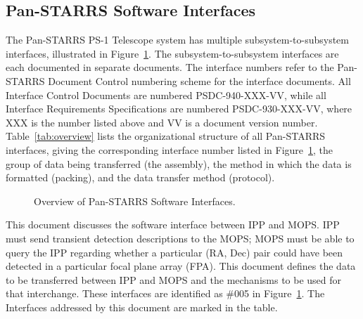 \documentclass[panstarrs,spec]{panstarrs}
\begin{document}
\subsection{Pan-STARRS Software Interfaces}

The Pan-STARRS PS-1 Telescope system has multiple
subsystem-to-subsystem interfaces, illustrated in
Figure~\ref{fig:overview}.  The subsystem-to-subsystem interfaces are
each documented in separate documents.  The interface numbers refer to
the Pan-STARRS Document Control numbering scheme for the interface
documents.  All Interface Control Documents are numbered
PSDC-940-XXX-VV, while all Interface Requirements Specifications are
numbered PSDC-930-XXX-VV, where XXX is the number listed above and VV
is a document version number.  Table~\ref{tab:overview} lists the
organizational structure of all Pan-STARRS interfaces, giving the
corresponding interface number listed in Figure~\ref{fig:overview},
the group of data being transferred (the assembly), the method in
which the data is formatted (packing), and the data transfer method
(protocol).

\begin{figure}
  \begin{center}
    \caption{Overview of Pan-STARRS Software Interfaces.}
    \label{fig:overview}
  \end{center}
\end{figure}

This document discusses the software interface between IPP and MOPS.
IPP must send transient detection descriptions to the MOPS; MOPS must
be able to query the IPP regarding whether a particular (RA, Dec) pair
could have been detected in a particular focal plane array (FPA).
This document defines the data to be transferred between IPP and MOPS
and the mechanisms to be used for that interchange.  These interfaces
are identified as \#005 in Figure~\ref{fig:overview}.  The Interfaces
addressed by this document are marked in the table.
\end{document}
